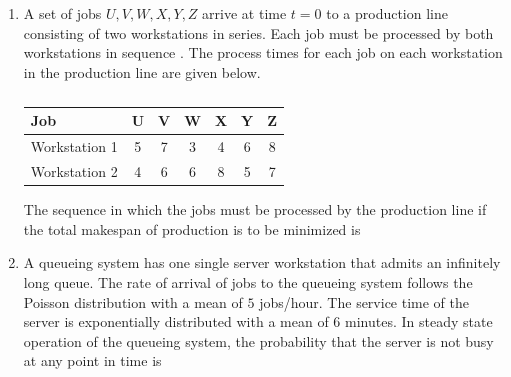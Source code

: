 \documentclass[journal]{IEEEtran}
\begin{document}
\begin{enumerate}[leftmargin=0pt]
\hfill{}

\vspace{4mm}

\item
A set of jobs $U, V, W, X, Y, Z$ arrive at time $t = 0$ to a production line consisting of two workstations in series. Each job must be processed by both workstations in sequence . The process times  for each job on each workstation in the production line are given below.

\begin{table}[h]
\centering
\begin{tabular}{|l|c|c|c|c|c|c|} \hline
Job           & U & V & W & X & Y & Z \\ \hline
Workstation 1 & 5 & 7 & 3 & 4 & 6 & 8 \\ \hline
Workstation 2 & 4 & 6 & 6 & 8 & 5 & 7 \\ \hline
\end{tabular}
\caption*{}
\label{tab:Q34}
\end{table}

The sequence in which the jobs must be processed by the production line if the total makespan of production is to be minimized is

\vspace{2mm}

\begin{enumerate}
\end{enumerate}

\hfill{}

\vspace{4mm}

\item
A queueing system has one single server workstation that admits an infinitely long queue. The rate of arrival of jobs to the queueing system follows the Poisson distribution with a mean of $5$ jobs/hour. The service time of the server is exponentially distributed with a mean of $6$ minutes. In steady state operation of the queueing system, the probability that the server is not busy at any point in time is


\end{enumerate}
\end{document}
